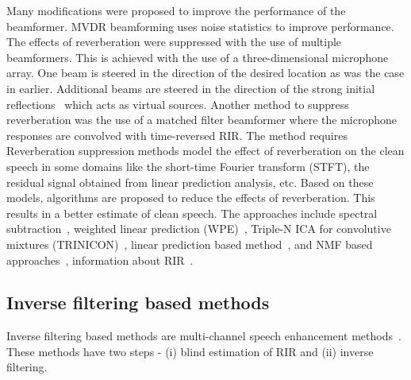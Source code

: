 Many modifications were proposed to improve the performance of the beamformer. MVDR beamforming uses noise statistics to improve performance. The effects of reverberation were suppressed with the use of multiple beamformers. This is achieved with the use of a three-dimensional microphone array. One beam is steered in the direction of the desired location as was the case in earlier.  Additional beams are steered in the direction of the strong initial reflections~\cite{nishiura2001speech} which acts as virtual sources. Another method to suppress reverberation was the use of a matched filter beamformer where the microphone responses are convolved with time-reversed RIR. The method requires Reverberation suppression methods model the effect of reverberation on the clean speech in some domains like the short-time Fourier transform (STFT), the residual signal obtained from linear prediction analysis, etc. Based on these models, algorithms are proposed to reduce the effects of reverberation. This results in a better estimate of clean speech. The approaches include spectral subtraction~\cite{lebart2001new}, weighted linear prediction (WPE)~\cite{nakatani2010speech}, Triple-N ICA for convolutive mixtures (TRINICON)~\cite{buchner2007trinicon}, linear prediction based method~\cite{naylor2010speech}, and NMF based approaches~\cite{kameoka2009robust}, information about RIR~\cite{naylor2010speech}.

\subsection{Inverse filtering based methods}
Inverse filtering based methods are multi-channel speech enhancement methods~\cite{naylor2010speech}. These methods have two steps - (i) blind estimation of RIR and (ii) inverse filtering.
